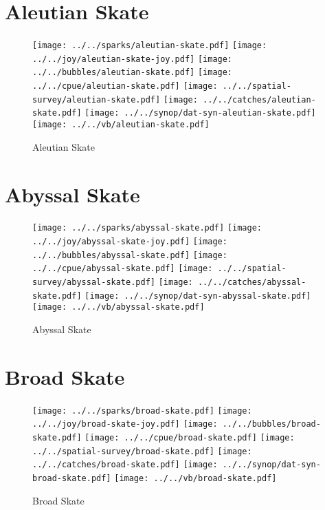 \section{Aleutian Skate}

\begin{figure}[htbp]
\centering
\texttt{[image: ../../sparks/aleutian-skate.pdf]}
\texttt{[image: ../../joy/aleutian-skate-joy.pdf]}
\texttt{[image: ../../bubbles/aleutian-skate.pdf]}
\texttt{[image: ../../cpue/aleutian-skate.pdf]}
\texttt{[image: ../../spatial-survey/aleutian-skate.pdf]}
\texttt{[image: ../../catches/aleutian-skate.pdf]}
\texttt{[image: ../../synop/dat-syn-aleutian-skate.pdf]}
\texttt{[image: ../../vb/aleutian-skate.pdf]}
\caption{Aleutian Skate}
\end{figure}
\clearpage
\section{Abyssal Skate}

\begin{figure}[htbp]
\centering
\texttt{[image: ../../sparks/abyssal-skate.pdf]}
\texttt{[image: ../../joy/abyssal-skate-joy.pdf]}
\texttt{[image: ../../bubbles/abyssal-skate.pdf]}
\texttt{[image: ../../cpue/abyssal-skate.pdf]}
\texttt{[image: ../../spatial-survey/abyssal-skate.pdf]}
\texttt{[image: ../../catches/abyssal-skate.pdf]}
\texttt{[image: ../../synop/dat-syn-abyssal-skate.pdf]}
\texttt{[image: ../../vb/abyssal-skate.pdf]}
\caption{Abyssal Skate}
\end{figure}
\clearpage
\section{Broad Skate}

\begin{figure}[htbp]
\centering
\texttt{[image: ../../sparks/broad-skate.pdf]}
\texttt{[image: ../../joy/broad-skate-joy.pdf]}
\texttt{[image: ../../bubbles/broad-skate.pdf]}
\texttt{[image: ../../cpue/broad-skate.pdf]}
\texttt{[image: ../../spatial-survey/broad-skate.pdf]}
\texttt{[image: ../../catches/broad-skate.pdf]}
\texttt{[image: ../../synop/dat-syn-broad-skate.pdf]}
\texttt{[image: ../../vb/broad-skate.pdf]}
\caption{Broad Skate}
\end{figure}
\clearpage
